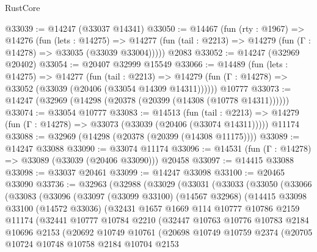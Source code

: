 \begin{lexlean}{RustCore}
\begin{coremodule}
@33039 := @14247 (@33037 @14341)
@33050 := @14467
    (fun (rty : @1967) =>
    @14276
      (fun (lets : @14275) =>
      @14277 (fun (tail : @2213) => @14279 (fun (Γ : @14278) => @33035 (@33039 @33004)))))
    @2083
@33052 := @14247 (@32969 @20402)
@33054 := @20407 @32999 @15549
@33066 := @14489
    (fun (lets : @14275) =>
    @14277
      (fun (tail : @2213) =>
      @14279 (fun (Γ : @14278) => @33052 (@33039 (@20406 (@33054 @14309 @14311))))))
    @10777
@33073 := @14247 (@32969 (@14298 (@20378 (@20399 (@14308 (@10778 @14311))))))
@33074 := @33054 @10777
@33083 := @14513
    (fun (tail : @2213) => @14279 (fun (Γ : @14278) => @33073 (@33039 (@20406 (@33074 @14311)))))
    @11174
@33088 := @32969 (@14298 (@20378 (@20399 (@14308 @11175))))
@33089 := @14247 @33088
@33090 := @33074 @11174
@33096 := @14531 (fun (Γ : @14278) => @33089 (@33039 (@20406 @33090))) @20458
@33097 := @14415 @33088
@33098 := @33037 @20461
@33099 := @14247 @33098
@33100 := @20465 @33090
@33736 := @32963
    (@32988
      (@33029
        (@33031
          (@33033
            (@33050
              (@33066
                (@33083
                  (@33096
                    (@33097
                      (@33099 @33100)
                      (@14567 @32968)
                      (@14415
                        @33098
                        @33100
                        (@14572 @33036)
                        (@32431
                          @1657
                          @1669
                          @114
                          @10777
                          @10786
                          @2159
                          @11174
                          (@32441
                            @10777
                            @10784
                            @2210
                            (@32447
                              @10763
                              @10776
                              @10783
                              @2184
                              @10696
                              @2153
                              (@20692
                                @10749
                                @10761
                                (@20698
                                  @10749
                                  @10759
                                  @2374
                                  (@20705
                                    @10724
                                    @10748
                                    @10758
                                    @2184
                                    @10704
                                    @2153

\end{coremodule}
\end{lexlean}

